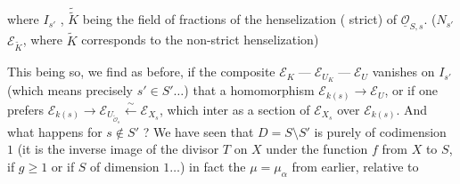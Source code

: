 where $I_{s'}$  , $\widetilde{\widetilde K}$ being the field
of fractions of the henselization ( strict)
of $\underline{\mathcal O}_{S,s}$. ($N_{s'}$  
$\mathcal E_{\widetilde K}$, where $\widetilde K$ corresponds to the non-strict henselization)

This being so, we find as before,
if the composite  $\mathcal E_K\mathrel{\text{---}}\mathcal E_{U_K}\mathrel{\text{---}}\mathcal E_U$
vanishes on $I_{s'}$   (which means
precisely  $s'\in S'\ldots$) that a homomorphism
$\mathcal E_{k(s)}\longrightarrow\mathcal E_U$, or if one prefers
$\mathcal E_{k(s)}\longrightarrow\mathcal E_{U_{\widetilde{\mathcal O}_s}}\xleftarrow{\sim}\mathcal E_{X_s}$, which   inter%
 as a section of $\mathcal E_{X_s}$ over
$\mathcal E_{k(s)}$. And what happens for
$s\notin S'$ ?  We have seen that
$D=S\setminus S'$ is purely of codimension $1$
(it is the inverse image of the divisor
$T$ on $X$ under the function $f$ from $X$ to $S$,
 if $g\geq1$ or if $S$ of dimension $1\ldots$)
in fact the $\mu=\mu_\alpha$ from earlier, relative to
